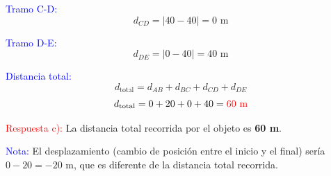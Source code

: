\begin{exercise}
\begin{solu}
        \textcolor{blue}{Tramo C-D:}
        \[
            d_{CD} = |40 - 40| = 0 \text{ m}
        \]

        \textcolor{blue}{Tramo D-E:}
        \[
            d_{DE} = |0 - 40| = 40 \text{ m}
        \]

        \textcolor{blue}{Distancia total:}
        \[
            d_{\text{total}} = d_{AB} + d_{BC} + d_{CD} + d_{DE}
        \]
        \[
            d_{\text{total}} = 0 + 20 + 0 + 40 = \textcolor{red}{60 \text{ m}}
        \]

        \textcolor{red}{Respuesta c):} La distancia total recorrida por el objeto es \textbf{60 m}.

        \textcolor{blue}{Nota:} El desplazamiento (cambio de posición entre el inicio y el final) sería $0 - 20 = -20$ m, que es diferente de la distancia total recorrida.
    \end{solu}
\end{exercise}

